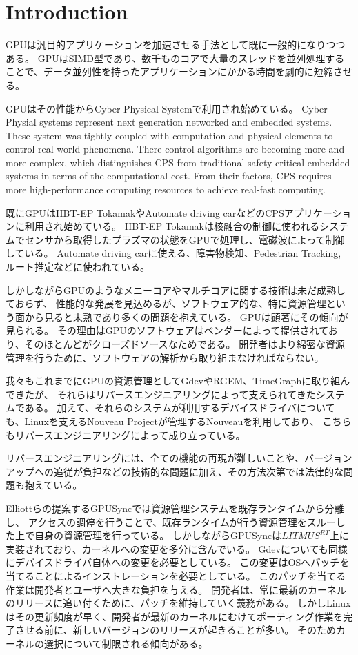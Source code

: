 \section{Introduction}
GPUは汎目的アプリケーションを加速させる手法として既に一般的になりつつある。
GPUはSIMD型であり、数千ものコアで大量のスレッドを並列処理することで、データ並列性を持ったアプリケーションにかかる時間を劇的に短縮させる。

GPUはその性能からCyber-Physical Systemで利用され始めている。
Cyber-Physial systems represent next generation networked and embedded systems.
These system was tightly coupled with computation and physical elements to control real-world phenomena.
There control algorithms are becoming more and more complex, which distinguishes CPS from traditional safety-critical embedded systems in terms of the computational cost.
From their factors, CPS requires more high-performance computing resources to achieve real-fast computing.

既にGPUはHBT-EP TokamakやAutomate driving carなどのCPSアプリケーションに利用され始めている。
HBT-EP Tokamakは核融合の制御に使われるシステムでセンサから取得したプラズマの状態をGPUで処理し、電磁波によって制御している。
Automate driving carに使える、障害物検知、Pedestrian Tracking, ルート推定などに使われている。

しかしながらGPUのようなメニーコアやマルチコアに関する技術は未だ成熟しておらず、
性能的な発展を見込めるが、ソフトウェア的な、特に資源管理という面から見ると未熟であり多くの問題を抱えている。
GPUは顕著にその傾向が見られる。
その理由はGPUのソフトウェアはベンダーによって提供されており、そのほとんどがクローズドソースなためである。
開発者はより綿密な資源管理を行うために、ソフトウェアの解析から取り組まなければならない。

我々もこれまでにGPUの資源管理としてGdevやRGEM、TimeGraphに取り組んできたが、
それらはリバースエンジニアリングによって支えられてきたシステムである。
加えて、それらのシステムが利用するデバイスドライバについても、Linuxを支えるNouveau Projectが管理するNouveauを利用しており、
こちらもリバースエンジニアリングによって成り立っている。

リバースエンジニアリングには、全ての機能の再現が難しいことや、バージョンアップへの追従が負担などの技術的な問題に加え、その方法次第では法律的な問題も抱えている。

Elliottらの提案するGPUSyncでは資源管理システムを既存ランタイムから分離し、
アクセスの調停を行うことで、既存ランタイムが行う資源管理をスルーした上で自身の資源管理を行っている。
しかしながらGPUSyncは$LITMUS^{RT}$上に実装されており、カーネルへの変更を多分に含んでいる。
Gdevについても同様にデバイスドライバ自体への変更を必要としている。
この変更はOSへパッチを当てることによるインストレーションを必要としている。
このパッチを当てる作業は開発者とユーザへ大きな負担を与える。
開発者は、常に最新のカーネルのリリースに追い付くために、パッチを維持していく義務がある。
しかしLinuxはその更新頻度が早く、開発者が最新のカーネルにむけてポーティング作業を完了させる前に、新しいバージョンのリリースが起きることが多い。
そのためカーネルの選択について制限される傾向がある。

